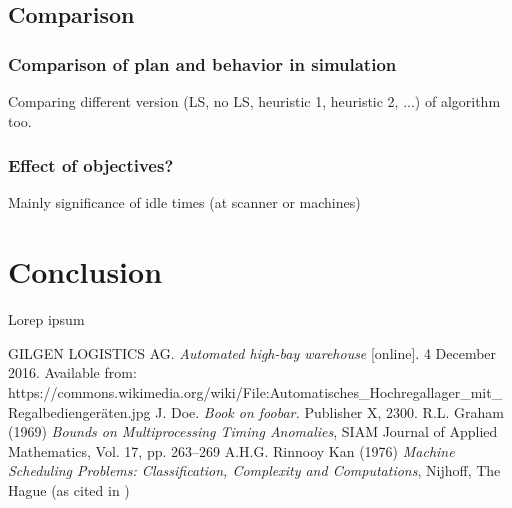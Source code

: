 \documentclass{ctuthesis}
\begin{document}
\section{Comparison}
\subsection{Comparison of plan and behavior in simulation}
Comparing different version (LS, no LS, heuristic 1, heuristic 2, ...) of algorithm too.
\subsection{Effect of objectives?}
Mainly significance of idle times (at scanner or machines)
\chapter{Conclusion}

Lorep ipsum \cite{doe}

\begin{thebibliography}{1}
 GILGEN LOGISTICS AG. \emph{Automated high-bay warehouse} [online]. 4 December 2016. Available from: https://commons.wikimedia.org/wiki/File:Automatisches\_Hochregallager\_mit\_Regalbediengeräten.jpg
 J. Doe. \emph{Book on foobar.} Publisher X,
 2300.
  R.L. Graham (1969) \emph{Bounds on Multiprocessing Timing Anomalies}, SIAM
Journal of Applied Mathematics, Vol. 17, pp. 263–269
 A.H.G. Rinnooy Kan (1976) \emph{Machine Scheduling Problems: Classification,
Complexity and Computations}, Nijhoff, The Hague (as cited in \cite{pinedo})


\end{thebibliography}
\end{document}
